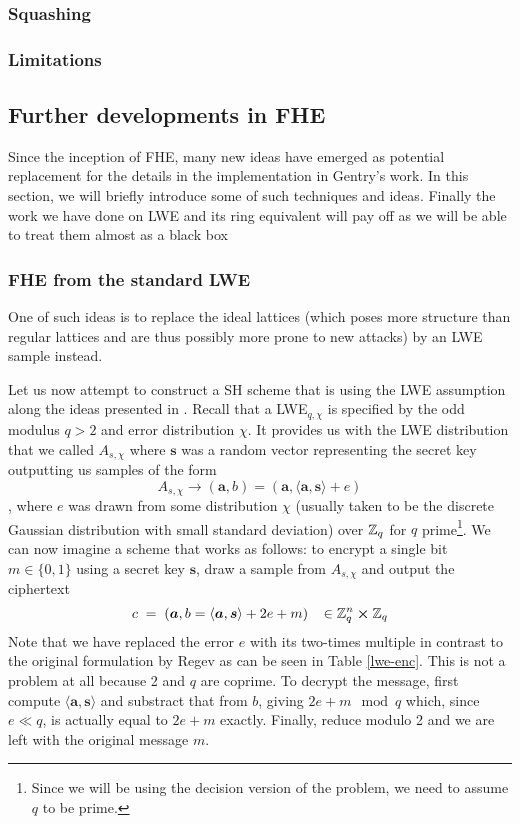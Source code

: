 \subsubsection{Squashing}
\subsubsection{Limitations}

\subsection{Further developments in FHE}
Since the inception of FHE, many new ideas have emerged as potential replacement for the details in the implementation in Gentry's work. In this section, we will briefly introduce some of such techniques and ideas. Finally the work we have done on LWE and its ring equivalent will pay off as we will be able to treat them almost as a black box

\subsubsection{FHE from the standard LWE}
 One of such ideas is to replace the ideal lattices (which poses more structure than regular lattices and are thus possibly more prone to new attacks) by an LWE sample instead.


 Let us now attempt to construct a SH scheme that is using the LWE assumption along the ideas presented in \cite{fhe-lwe}. Recall that a LWE$_{q, \chi}$ is specified by the odd modulus $q > 2$ and error distribution $\chi$. It provides us with the LWE distribution that we called $A_{s, \chi}$ where $\bm{s}$ was a random vector representing the secret key outputting us samples of the form
\[A_{s, \chi} \rightarrow (\bm{a}, b) = (\bm{a}, \langle \bm{a}, \bm{s} \rangle + e)\],
where $e$ was drawn from some distribution $\chi$ (usually taken to be the discrete Gaussian distribution with small standard deviation) over $\mathbb{Z}_q$ for $q$ prime\footnote{Since we will be using the decision version of the problem, we need to assume $q$ to be prime.}. We can now imagine a scheme that works as follows: to encrypt a single bit $m \in \{0,1\}$ using a secret key $\bm{s}$, draw a sample from $A_{s, \chi}$ and output the ciphertext
\[ c \; = \; (\boldsymbol{a}, b = \langle \boldsymbol{a}, \boldsymbol{s} \rangle +2e +m) \; \; \; \in \mathbb{Z}_q^n \cross \mathbb{Z}_q \]
Note that we have replaced the error $e$ with its two-times multiple in contrast to the original formulation by Regev as can be seen in Table \ref{lwe-enc}. This is not a problem at all because 2 and $q$ are coprime. To decrypt the message, first compute $\langle \bm{a},\bm{s} \rangle$ and substract that from $b$, giving $2e + m \mod q$ which, since $e \ll q$, is actually equal to $2e +m$ exactly. Finally, reduce modulo 2 and we are left with the original message $m$.

